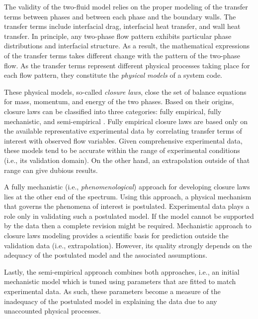 The validity of the two-fluid model relies on the proper modeling of the transfer terms between phases and between each phase and the boundary walls.
The transfer terms include interfacial drag, interfacial heat transfer, and wall heat transfer.
In principle, any two-phase flow pattern exhibits particular phase distributions and interfacial structure.
As a result, the mathematical expressions of the transfer terms takes different change with the pattern of the two-phase flow.
As the transfer terms represent different physical processes taking place for each flow pattern, they constitute the \emph{physical models} of a system code.

These physical models, so-called \emph{closure laws}, close the set of balance equations for mass, momentum, and energy of the two phases.
Based on their origins, closure laws can be classified into three categories: fully empirical, fully mechanistic, and semi-empirical \cite{Bestion2008}.
Fully empirical closure laws are based only on the available representative experimental data by correlating transfer terms of interest with observed flow variables.
Given comprehensive experimental data, these models tend to be accurate within the range of experimental conditions (i.e., its validation domain).
On the other hand, an extrapolation outside of that range can give dubious results.

A fully mechanistic (i.e., \emph{phenomenological}) approach for developing closure laws lies at the other end of the spectrum.
Using this approach, a physical mechanism that governs the phenomena of interest is postulated.
Experimental data plays a role only in validating such a postulated model.
If the model cannot be supported by the data then a complete revision might be required.
Mechanistic approach to closure laws modeling provides a scientific basis for prediction outside the validation data (i.e., extrapolation). 
However, its quality strongly depends on the adequacy of the postulated model and the associated assumptions.

Lastly, the semi-empirical approach combines both approaches, i.e., an initial mechanistic model which is tuned using parameters that are fitted to match experimental data.
As such, these parameters become a measure of the inadequacy of the postulated model in explaining the data due to any unaccounted physical processes.


